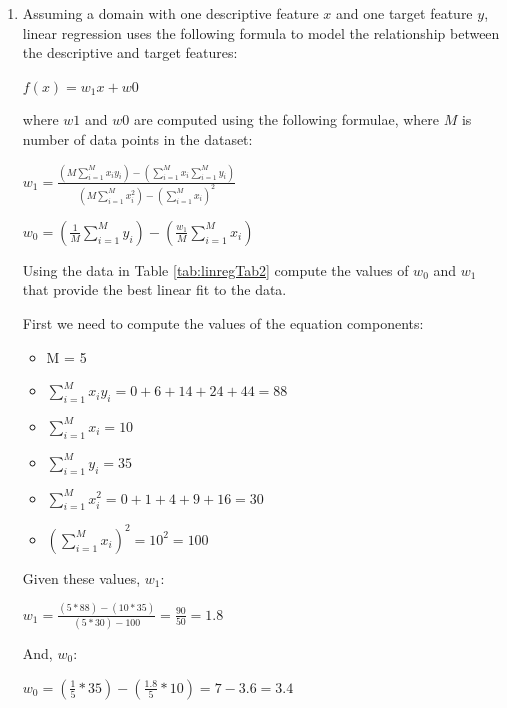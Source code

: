 \documentclass[--SOLUTION-OPTION--]{ditpaper}
\begin{document}
\question 
	\begin{enumerate}
		\item Assuming a domain with one descriptive feature $x$ and one target feature $y$, linear regression uses the following formula to model the relationship between the descriptive and target features: 
	\begin{center}
		$\displaystyle f(x) = w_1x + w0$
	\end{center}
where $w1$ and $w0$ are computed using the following formulae, where $M$ is number of data points in the dataset:
	\begin{center}
		$\displaystyle w_1 =  \frac{(M \sum_{i=1}^M x_i y_i) - (\sum_{i=1}^{M} x_i \sum_{i=1}^{M} y_i)} {(M \sum_{i=1}^{M} x_i^2) - (\sum_{i=1}^{M} x_i)^2}$
	\end{center}
	\begin{center}
		$\displaystyle w_0 = (\frac{1}{M} \sum_{i=1}^{M} y_i) - (\frac{w_1}{M} \sum_{i=1}^{M} x_i)$
	\end{center}
Using the data in Table \ref{tab:linregTab2} compute the values of $w_0$ and $w_1$ that provide the best linear fit to the data.
			\begin{answer}
				First we need to compute the values of the equation components:
			\begin{itemize}
				\item M = 5
				\item $\sum_{i=1}^{M} x_i y_i = 0 + 6 + 14 + 24 + 44 = 88$
				\item $\sum_{i=1}^{M} x_i = 10$
			   	\item $\sum_{i=1}^{M} y_i = 35$
			  	\item $\sum_{i=1}^{M} x_i^2 = 0 + 1 + 4 + 9 + 16 = 30$
			  	\item $(\sum_{i=1}^{M} x_i)^2 = 10^2 = 100$
			\end{itemize}
				Given these values,  $w_1$:
				\begin{center}
					\textbf{$w_1= \frac{(5*88)-(10*35)}{(5*30)-100} = \frac{90}{50}=1.8$}
				\end{center}
				And, $w_0$:
				\begin{center}
				\textbf{$w_0= (\frac{1}{5}*35) - (\frac{1.8}{5}*10)= 7-3.6=3.4$}
			\end{center}
			\end{answer}
		

\end{enumerate}
\end{document}
